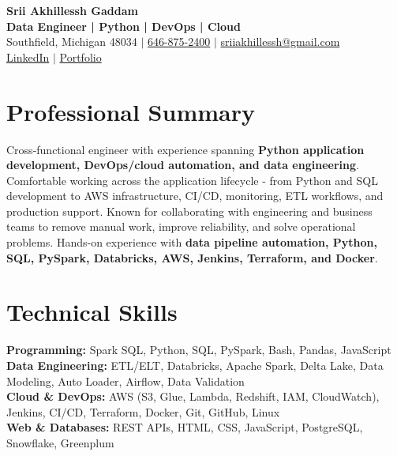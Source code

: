 \documentclass[letterpaper,10pt]{article}
\begin{document}
\fontsize{9.35pt}{10.45pt}\selectfont

\begin{center}
    {\LARGE \textbf{Srii Akhillessh Gaddam}} \\[-1pt]
    \textbf{Data Engineer | Python | DevOps | Cloud} \\[2pt]
    Southfield, Michigan 48034 $|$
    \href{tel:6468752400}{646-875-2400} $|$
    \href{mailto:sriiakhillessh@gmail.com}{sriiakhillessh@gmail.com} \\[1pt]
    \href{https://www.linkedin.com/in/srii-akhiilessh-gaddam-b48668191/}{LinkedIn} $|$
    \href{https://sriiakhillesshg.github.io/portfolio/}{Portfolio}
\end{center}
\vspace{-8pt}

\section{Professional Summary}
\small{Cross-functional engineer with experience spanning \textbf{Python application development, DevOps/cloud automation, and data engineering}. Comfortable working across the application lifecycle - from Python and SQL development to AWS infrastructure, CI/CD, monitoring, ETL workflows, and production support. Known for collaborating with engineering and business teams to remove manual work, improve reliability, and solve operational problems. Hands-on experience with \textbf{data pipeline automation, Python, SQL, PySpark, Databricks, AWS, Jenkins, Terraform, and Docker}.}

\section{Technical Skills}
\small{
\textbf{Programming:} Spark SQL, Python, SQL, PySpark, Bash, Pandas, JavaScript \\
\textbf{Data Engineering:} ETL/ELT, Databricks, Apache Spark, Delta Lake, Data Modeling, Auto Loader, Airflow, Data Validation \\
\textbf{Cloud \& DevOps:} AWS (S3, Glue, Lambda, Redshift, IAM, CloudWatch), Jenkins, CI/CD, Terraform, Docker, Git, GitHub, Linux \\
\textbf{Web \& Databases:} REST APIs, HTML, CSS, JavaScript, PostgreSQL, Snowflake, Greenplum
}

\end{document}
